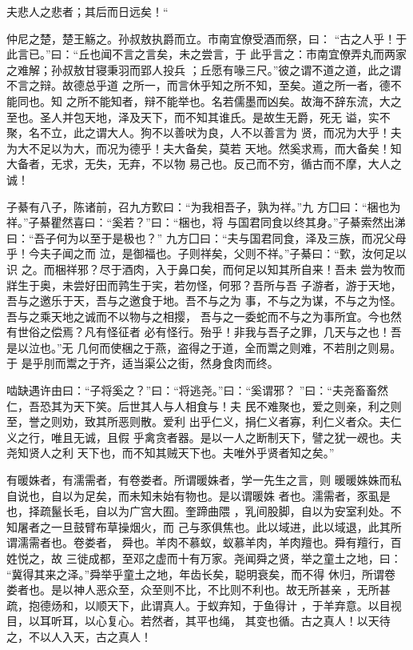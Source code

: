 \documentclass[]{article}
\begin{document}
夫悲人之悲者；其后而日远矣！``

仲尼之楚，楚王觞之。孙叔敖执爵而立。市南宜僚受酒而祭，曰：
``古之人乎！于此言已。''曰：``丘也闻不言之言矣，未之尝言，于
此乎言之：市南宜僚弄丸而两家之难解；孙叔敖甘寝秉羽而郢人投兵
；丘愿有喙三尺。''彼之谓不道之道，此之谓不言之辩。故德总乎道
之所一，而言休乎知之所不知，至矣。道之所一者，德不能同也。知
之所不能知者，辩不能举也。名若儒墨而凶矣。故海不辞东流，大之
至也。圣人并包天地，泽及天下，而不知其谁氏。是故生无爵，死无
谥，实不聚，名不立，此之谓大人。狗不以善吠为良，人不以善言为
贤，而况为大乎！夫为大不足以为大，而况为德乎！夫大备矣，莫若
天地。然奚求焉，而大备矣！知大备者，无求，无失，无弃，不以物
易己也。反己而不穷，循古而不摩，大人之诚！

子綦有八子，陈诸前，召九方歅曰：``为我相吾子，孰为祥。''九
方囗曰：``梱也为祥。''子綦瞿然喜曰：``奚若？''曰：``梱也，将
与国君同食以终其身。''子綦索然出涕曰：``吾子何为以至于是极也？''
九方囗曰：``夫与国君同食，泽及三族，而况父母乎！今夫子闻之而
泣，是御福也。子则祥矣，父则不祥。''子綦曰：``歅，汝何足以识
之。而梱祥邪？尽于酒肉，入于鼻口矣，而何足以知其所自来！吾未
尝为牧而牂生于奥，未尝好田而鹑生于宎，若勿怪，何邪？吾所与吾
子游者，游于天地，吾与之邀乐于天，吾与之邀食于地。吾不与之为
事，不与之为谋，不与之为怪。吾与之乘天地之诚而不以物与之相撄，
吾与之一委蛇而不与之为事所宜。今也然有世俗之偿焉？凡有怪征者
必有怪行。殆乎！非我与吾子之罪，几天与之也！吾是以泣也。''无
几何而使梱之于燕，盗得之于道，全而鬻之则难，不若刖之则易。于
是乎刖而鬻之于齐，适当渠公之街，然身食肉而终。

啮缺遇许由曰：``子将奚之？''曰：``将逃尧。''曰：``奚谓邪？
''曰：``夫尧畜畜然仁，吾恐其为天下笑。后世其人与人相食与！夫
民不难聚也，爱之则亲，利之则至，誉之则劝，致其所恶则散。爱利
出乎仁义，捐仁义者寡，利仁义者众。夫仁义之行，唯且无诚，且假
乎禽贪者器。是以一人之断制天下，譬之犹一覕也。夫尧知贤人之利
天下也，而不知其贼天下也。夫唯外乎贤者知之矣。''

有暖姝者，有濡需者，有卷娄者。所谓暖姝者，学一先生之言，则
暖暖姝姝而私自说也，自以为足矣，而未知未始有物也。是以谓暖姝
者也。濡需者，豕虱是也，择疏鬣长毛，自以为广宫大囿。奎蹄曲隈
，乳间股脚，自以为安室利处。不知屠者之一旦鼓臂布草操烟火，而
己与豕俱焦也。此以域进，此以域退，此其所谓濡需者也。卷娄者，
舜也。羊肉不慕蚁，蚁慕羊肉，羊肉羶也。舜有羶行，百姓悦之，故
三徙成都，至邓之虚而十有万家。尧闻舜之贤，举之童土之地，曰：
``冀得其来之泽。''舜举乎童土之地，年齿长矣，聪明衰矣，而不得
休归，所谓卷
娄者也。是以神人恶众至，众至则不比，不比则不利也。故无所甚亲
，无所甚疏，抱德炀和，以顺天下，此谓真人。于蚁弃知，于鱼得计
，于羊弃意。以目视目，以耳听耳，以心复心。若然者，其平也绳，
其变也循。古之真人！以天待之，不以人入天，古之真人！
\end{document}
